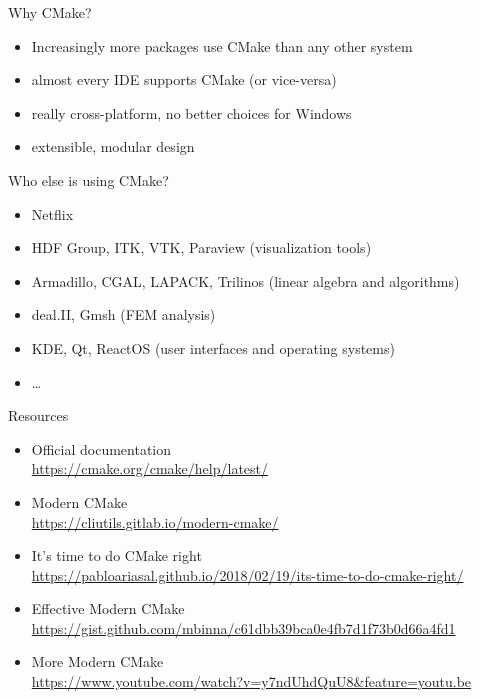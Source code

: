 \documentclass[aspectratio=169,11pt]{beamer}
\begin{document}
\begin{frame}{Why CMake?}
\begin{itemize}
    \item Increasingly more packages use CMake than any other system
    \item almost every IDE supports CMake (or vice-versa)
    \item really cross-platform, no better choices for Windows
    \item extensible, modular design
\end{itemize}
\vfill
\pause
Who else is using CMake?
\begin{itemize}
    \item Netflix
    \item HDF Group, ITK, VTK, Paraview (visualization tools)
    \item Armadillo, CGAL, LAPACK, Trilinos (linear algebra and algorithms)
    \item deal.II, Gmsh (FEM analysis)
    \item KDE, Qt, ReactOS (user interfaces and operating systems)
    \item \dots
\end{itemize}
\end{frame}

\begin{frame}{Resources}
\begin{itemize}
    \item Official documentation\\
    \url{https://cmake.org/cmake/help/latest/}
    \vfill
    \item Modern CMake\\
    \url{https://cliutils.gitlab.io/modern-cmake/}
    \vfill
    \item{It's time to do CMake right}\\
    \url{https://pabloariasal.github.io/2018/02/19/its-time-to-do-cmake-right/}
    \vfill
    \item Effective Modern CMake\\ \url{https://gist.github.com/mbinna/c61dbb39bca0e4fb7d1f73b0d66a4fd1}
    \vfill
    \item More Modern CMake\\ \url{https://www.youtube.com/watch?v=y7ndUhdQuU8&feature=youtu.be}
\end{itemize}
\end{frame}
\end{document}
